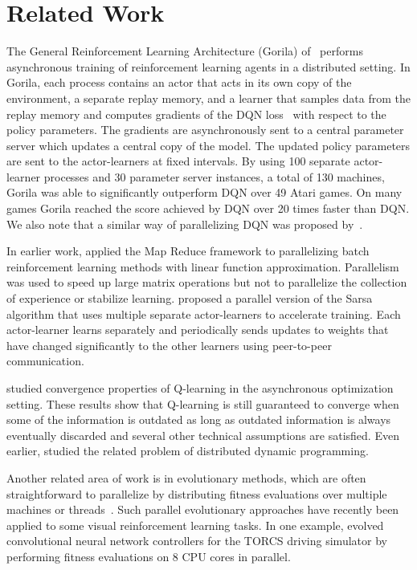 %
\vspace{-0.1cm}
\section{Related Work}
\label{sec:related}

The General Reinforcement Learning Architecture (Gorila) of~\cite{nair2015gorila} performs asynchronous training of reinforcement learning agents in a distributed setting.
In Gorila, each process contains an actor that acts in its own copy of the environment, a separate replay memory, and a learner that samples data from the replay memory and computes gradients of the DQN loss~\citep{mnih-dqn-2015} with respect to the policy parameters.
The gradients are asynchronously sent to a central parameter server which updates a central copy of the model.
The updated policy parameters are sent to the actor-learners at fixed intervals.
By using 100 separate actor-learner processes and 30 parameter server instances, a total of 130 machines, Gorila was able to significantly outperform DQN over 49 Atari games.
On many games Gorila reached the score achieved by DQN over 20 times faster than DQN.
We also note that a similar way of parallelizing DQN was proposed by~\cite{chavez2015deepq}.

In earlier work, \cite{li:mapreduce} applied the Map Reduce framework to parallelizing batch reinforcement learning methods with linear function approximation.
Parallelism was used to speed up large matrix operations but not to parallelize the collection of experience or stabilize learning.
\cite{grounds:parallelRL} proposed a parallel version of the Sarsa algorithm that uses multiple separate actor-learners to accelerate training.
Each actor-learner learns separately and periodically sends updates to weights that have changed significantly to the other learners using peer-to-peer communication.

\cite{tsitsiklis1994asynchronous} studied convergence properties of Q-learning in the asynchronous optimization setting.
These results show that Q-learning is still guaranteed to converge when some of the information is outdated as long as outdated information is always eventually discarded and several other technical assumptions are satisfied.
Even earlier, \cite{bertsekas1982distributed} studied the related problem of distributed dynamic programming.

Another related area of work is in evolutionary methods, which are often straightforward to parallelize by distributing fitness evaluations over multiple machines or threads~\citep{tomassini1999parallel}.
Such parallel evolutionary approaches have recently been applied to some visual reinforcement learning tasks.
In one example, \cite{koutnik2014} evolved convolutional neural network controllers for the TORCS driving simulator by performing fitness evaluations on 8 CPU cores in parallel.
